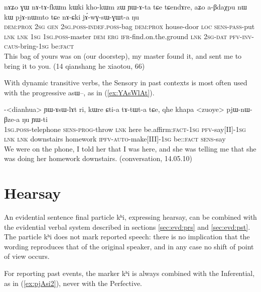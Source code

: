 \documentclass[oldfontcommands,oneside,a4paper,11pt]{article}
\newcommand{\ipa}[1]{{\phon \mbox{#1}}} %
\newcommand{\refb}[1]{(\ref{#1})}
\newcommand{\factual}[1]{\textsc{:fact}}
\begin{document}
\begin{exe}
\ex \label{ex:jAwGsWGWta}
\gll  \ipa{kɯki} 	\ipa{nɤʑo} 	\ipa{ɣɯ} 	\ipa{nɤ-tɤ-fkɯm} 	\ipa{kɯki} 	\ipa{kho-kɯm} 	\ipa{zɯ} 	\ipa{ɲɯ-ɤ-ta} 	\ipa{tɕe} 	\ipa{tɕendɤre,} \ipa{aʑo} 	\ipa{a-βdaχpu} 	\ipa{nɯ} 	\ipa{kɯ} 	\ipa{pjɤ-nɯmto} 	\ipa{tɕe} 	\ipa{nɤ-ɕki} 	\ipa{jɤ́-wɣ-sɯ-ɣɯt-a} 	\ipa{ŋu}  \\
 \textsc{dem:prox}  \textsc{2sg} \textsc{gen} \textsc{2sg.poss-indef.poss}-bag \textsc{dem:prox} house-door \textsc{loc} \textsc{sens-pass}-put \textsc{lnk} \textsc{lnk} \textsc{1sg} \textsc{1sg.poss}-master \textsc{dem} \textsc{erg} \textsc{ifr}-find.on.the.ground  \textsc{lnk} \textsc{2sg-dat} \textsc{pfv-inv-caus}-bring-\textsc{1sg} be\factual{} \\
\glt This bag of yours was on (our doorstep), my master found it, and sent me to bring it to you. (14 qianshang he xiaotou, 66)
\end{exe}

With dynamic transitive verbs, the Sensory in past contexts is most often used with the progressive \ipa{asɯ--}, as in \refb{ex:YAsWlAt}.

\begin{exe}
\ex \label{ex:YAsWlAt}
\gll  \ipa{a}-<dianhua> 	\ipa{ɲɯ-ɤsɯ-lɤt} 	\ipa{ri,} 	\ipa{kɯre} 	\ipa{ɕti-a} 	\ipa{tɤ-tɯt-a} 	\ipa{tɕe,} 	\ipa{qhe} 	\ipa{khapa} 	<zuoye> 	\ipa{pjɯ-nɯ-βze-a} 	\ipa{ŋu} 	\ipa{ɲɯ-ti} \\
\textsc{1sg.poss}-telephone \textsc{sens-prog}-throw \textsc{lnk} here be.affirm\factual{}-\textsc{1sg} \textsc{pfv}-say[II]-\textsc{1sg} \textsc{lnk} \textsc{lnk} downstairs homework \textsc{ipfv-auto}-make[III]-\textsc{1sg} be:\factual{} \textsc{sens}-say \\
\glt We were on the phone, I told her that I was here, and she was telling me that she was doing her homework downstairs. (conversation, 14.05.10)
\end{exe}

\section{Hearsay}
An evidential sentence final particle \ipa{kʰi}, expressing hearsay, can be combined with the evidential verbal system described in sections \ref{sec:evd:prs} and \ref{sec:evd:pst}. The particle \ipa{kʰi} does not mark reported speech: there is no implication that the wording reproduces that of the original speaker, and in any case no shift of point of view occurs. 

For reporting past events, the marker \ipa{kʰi} is always combined with the Inferential, as in \refb{ex:pjAsi2}, never with the Perfective.
\end{document}
